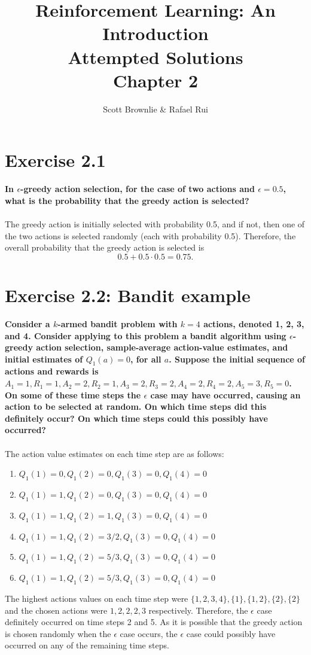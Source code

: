 \documentclass[a4paper,11pt]{article}
\title{Reinforcement Learning: An Introduction \\ Attempted Solutions \\ Chapter 2}
\author{Scott Brownlie \& Rafael Rui}
\date{}
\numberwithin{equation}{section}
\theoremstyle{remark}
\begin{document}
\maketitle

\section{Exercise 2.1}

\textbf{In $\epsilon$-greedy action selection, for the case of two actions and $\epsilon = 0.5$, what is the probability that the greedy action is selected?}
\\ \\
The greedy action is initially selected with probability 0.5, and if not, then one of the two actions is selected randomly (each with probability 0.5). Therefore, the overall probability that the greedy action is selected is
\[
	0.5 + 0.5 \cdot 0.5 = 0.75.
\]


\section{Exercise 2.2: Bandit example}

\textbf{Consider a $k$-armed bandit problem with $k = 4$ actions, denoted 1, 2, 3, and 4. Consider applying to this problem a bandit algorithm using $\epsilon$-greedy action selection, sample-average action-value estimates, and initial estimates of $Q_1(a) = 0$, for all $a$. Suppose the initial sequence of actions and rewards is $A_1 = 1, R_1 = 1, A_2 = 2, R_2 = 1, A_3 = 2, R_3 = 2, A_4 = 2, R_4 = 2, A_5 = 3, R_5 = 0$. On some of these time steps the $\epsilon$ case may have occurred, causing an action to be selected at random. On which time steps did this definitely occur? On which time steps could this possibly have occurred?}
\\ \\
The action value estimates on each time step are as follows:
\begin{enumerate}
	\item $Q_1(1) = 0, Q_1(2) = 0, Q_1(3) = 0, Q_1(4) = 0$
	\item $Q_1(1) = 1, Q_1(2) = 0, Q_1(3) = 0, Q_1(4) = 0$
	\item $Q_1(1) = 1, Q_1(2) = 1, Q_1(3) = 0, Q_1(4) = 0$
	\item $Q_1(1) = 1, Q_1(2) = 3/2, Q_1(3) = 0, Q_1(4) = 0$
	\item $Q_1(1) = 1, Q_1(2) = 5/3, Q_1(3) = 0, Q_1(4) = 0$
	\item $Q_1(1) = 1, Q_1(2) = 5/3, Q_1(3) = 0, Q_1(4) = 0$
\end{enumerate}
The highest actions values on each time step were $\{1,2,3,4\}, \{1\}, \{1, 2\}, \{2\}, \{2\}$ and the chosen actions were $1,2,2,2,3$ respectively.
Therefore, the $\epsilon$ case definitely occurred on time steps 2 and 5. As it is possible that the greedy action is chosen randomly when the $\epsilon$ case occurs, the $\epsilon$ case could possibly have occurred on any of the remaining time steps.
\end{document}
